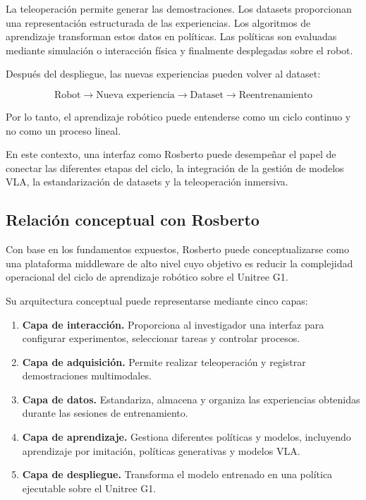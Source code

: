 \documentclass[stu,12pt,floatsintext]{apa7}
\begin{document}
La teleoperación permite generar las demostraciones. Los datasets proporcionan una representación estructurada de las experiencias. Los algoritmos de aprendizaje transforman estos datos en políticas. Las políticas son evaluadas mediante simulación o interacción física y finalmente desplegadas sobre el robot.

Después del despliegue, las nuevas experiencias pueden volver al dataset:

\begin{equation}
\text{Robot}
\rightarrow
\text{Nueva experiencia}
\rightarrow
\text{Dataset}
\rightarrow
\text{Reentrenamiento}
\end{equation}

Por lo tanto, el aprendizaje robótico puede entenderse como un ciclo continuo y no como un proceso lineal.

En este contexto, una interfaz como Rosberto puede desempeñar el papel de conectar las diferentes etapas del ciclo, la integración de la gestión de modelos VLA, la estandarización de datasets y la teleoperación inmersiva.

\subsection{Relación conceptual con Rosberto}

Con base en los fundamentos expuestos, Rosberto puede conceptualizarse como una plataforma middleware de alto nivel cuyo objetivo es reducir la complejidad operacional del ciclo de aprendizaje robótico sobre el Unitree G1.

Su arquitectura conceptual puede representarse mediante cinco capas:

\begin{enumerate}
    \item \textbf{Capa de interacción.} Proporciona al investigador una interfaz para configurar experimentos, seleccionar tareas y controlar procesos.
    
    \item \textbf{Capa de adquisición.} Permite realizar teleoperación y registrar demostraciones multimodales.
    
    \item \textbf{Capa de datos.} Estandariza, almacena y organiza las experiencias obtenidas durante las sesiones de entrenamiento.
    
    \item \textbf{Capa de aprendizaje.} Gestiona diferentes políticas y modelos, incluyendo aprendizaje por imitación, políticas generativas y modelos VLA.
    
    \item \textbf{Capa de despliegue.} Transforma el modelo entrenado en una política ejecutable sobre el Unitree G1.
\end{enumerate}
\end{document}

